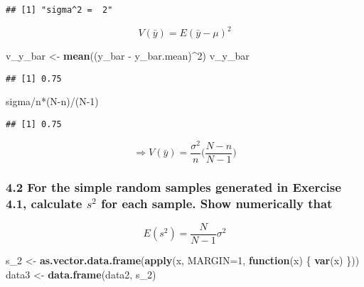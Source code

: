 \documentclass[
]{article}
\newenvironment{Shaded}{\begin{snugshade}}{\end{snugshade}}
\newcommand{\AttributeTok}[1]{\textcolor[rgb]{0.74,0.68,0.62}{#1}}
\newcommand{\ControlFlowTok}[1]{\textcolor[rgb]{0.26,0.66,0.93}{\textbf{#1}}}
\newcommand{\DecValTok}[1]{\textcolor[rgb]{0.27,0.67,0.26}{#1}}
\newcommand{\FunctionTok}[1]{\textcolor[rgb]{1.00,0.58,0.35}{\textbf{#1}}}
\newcommand{\NormalTok}[1]{\textcolor[rgb]{0.74,0.68,0.62}{#1}}
\newcommand{\OtherTok}[1]{\textcolor[rgb]{0.74,0.68,0.62}{#1}}
\newcommand{\SpecialCharTok}[1]{\textcolor[rgb]{0.02,0.61,0.04}{#1}}
\begin{document}
\begin{verbatim}
## [1] "sigma^2 =  2"
\end{verbatim}

\[V(\bar{y}) = E(\bar{y}-\mu)^2 \]

\begin{Shaded}
\begin{Highlighting}[]
\NormalTok{v\_y\_bar }\OtherTok{\textless{}{-}} \FunctionTok{mean}\NormalTok{((y\_bar }\SpecialCharTok{{-}}\NormalTok{ y\_bar.mean)}\SpecialCharTok{\^{}}\DecValTok{2}\NormalTok{)}
\NormalTok{v\_y\_bar}
\end{Highlighting}
\end{Shaded}

\begin{verbatim}
## [1] 0.75
\end{verbatim}

\begin{Shaded}
\begin{Highlighting}[]
\NormalTok{sigma}\SpecialCharTok{/}\NormalTok{n}\SpecialCharTok{*}\NormalTok{(N}\SpecialCharTok{{-}}\NormalTok{n)}\SpecialCharTok{/}\NormalTok{(N}\DecValTok{{-}1}\NormalTok{)}
\end{Highlighting}
\end{Shaded}

\begin{verbatim}
## [1] 0.75
\end{verbatim}

\[\Rightarrow V(\bar{y}) = \frac{\sigma^2}n \bigg(\frac{N-n}{N-1}\bigg)\]

\hypertarget{for-the-simple-random-samples-generated-in-exercise-4.1-calculate-s2-for-each-sample.-show-numerically-that}{%
\subsubsection{\texorpdfstring{4.2 For the simple random samples
generated in Exercise 4.1, calculate \(s^2\) for each sample. Show
numerically
that}{4.2 For the simple random samples generated in Exercise 4.1, calculate s\^{}2 for each sample. Show numerically that}}\label{for-the-simple-random-samples-generated-in-exercise-4.1-calculate-s2-for-each-sample.-show-numerically-that}}

\[E(s^2) = \frac{N}{N-1}\sigma^2\]

\begin{Shaded}
\begin{Highlighting}[]
\NormalTok{s\_2 }\OtherTok{\textless{}{-}} \FunctionTok{as.vector.data.frame}\NormalTok{(}\FunctionTok{apply}\NormalTok{(x, }\AttributeTok{MARGIN=}\DecValTok{1}\NormalTok{, }\ControlFlowTok{function}\NormalTok{(x) \{}
  \FunctionTok{var}\NormalTok{(x)}
\NormalTok{\}))}
\NormalTok{data3 }\OtherTok{\textless{}{-}} \FunctionTok{data.frame}\NormalTok{(data2, s\_2)}
\end{Highlighting}
\end{Shaded}
\end{document}
